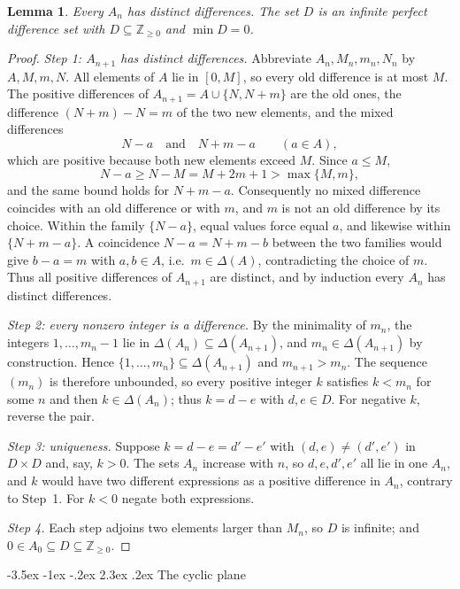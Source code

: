 \documentclass[11pt]{article}
\makeatletter
\renewcommand\section{\@startsection{section}{1}{\z@}
  {-3.5ex \@plus -1ex \@minus -.2ex}
  {2.3ex \@plus.2ex}
  {\normalfont\bfseries}}
\theoremstyle{plain}
\newtheorem{lemma}[theorem]{Lemma}
\theoremstyle{definition}
\newcommand{\Z}{\mathbb{Z}}
\makeatother
\begin{document}
\begin{lemma}\label{lem:diff}
Every $A_n$ has distinct differences.  The set $D$ is an infinite
perfect difference set with $D\subseteq\Z_{\geq0}$ and $\min D=0$.
\end{lemma}
\begin{proof}
\emph{Step 1: $A_{n+1}$ has distinct differences.}
Abbreviate $A_n,M_n,m_n,N_n$ by $A,M,m,N$.  All elements of $A$ lie in
$[0,M]$, so every old difference is at most $M$.  The positive
differences of $A_{n+1}=A\cup\{N,N+m\}$ are the old ones, the
difference $(N+m)-N=m$ of the two new elements, and the mixed
differences
\[
 N-a\quad\text{and}\quad N+m-a\qquad(a\in A),
\]
which are positive because both new elements exceed $M$.  Since
$a\leq M$,
\[
 N-a\geq N-M=M+2m+1>\max\{M,m\},
\]
and the same bound holds for $N+m-a$.  Consequently no mixed difference
coincides with an old difference or with $m$, and $m$ is not an old
difference by its choice.  Within the family $\{N-a\}$, equal values
force equal $a$, and likewise within $\{N+m-a\}$.  A coincidence
$N-a=N+m-b$ between the two families would give $b-a=m$ with
$a,b\in A$, i.e.\ $m\in\Delta(A)$, contradicting the choice of $m$.
Thus all positive differences of $A_{n+1}$ are distinct, and by
induction every $A_n$ has distinct differences.

\emph{Step 2: every nonzero integer is a difference.}
By the minimality of $m_n$, the integers $1,\dots,m_n-1$ lie in
$\Delta(A_n)\subseteq\Delta(A_{n+1})$, and $m_n\in\Delta(A_{n+1})$ by
construction.  Hence $\{1,\dots,m_n\}\subseteq\Delta(A_{n+1})$ and
$m_{n+1}>m_n$.  The sequence $(m_n)$ is therefore unbounded, so every
positive integer $k$ satisfies $k<m_n$ for some $n$ and then
$k\in\Delta(A_n)$; thus $k=d-e$ with $d,e\in D$.  For negative $k$,
reverse the pair.

\emph{Step 3: uniqueness.}
Suppose $k=d-e=d'-e'$ with $(d,e)\neq(d',e')$ in $D\times D$ and, say,
$k>0$.  The sets $A_n$ increase with $n$, so $d,e,d',e'$ all lie in one
$A_n$, and $k$ would have two different expressions as a positive
difference in $A_n$, contrary to Step~1.  For $k<0$ negate both
expressions.

\emph{Step 4.}  Each step adjoins two elements larger than $M_n$, so $D$
is infinite; and $0\in A_0\subseteq D\subseteq\Z_{\geq0}$.
\end{proof}

\section{The cyclic plane}\label{sec:plane}
\end{document}
